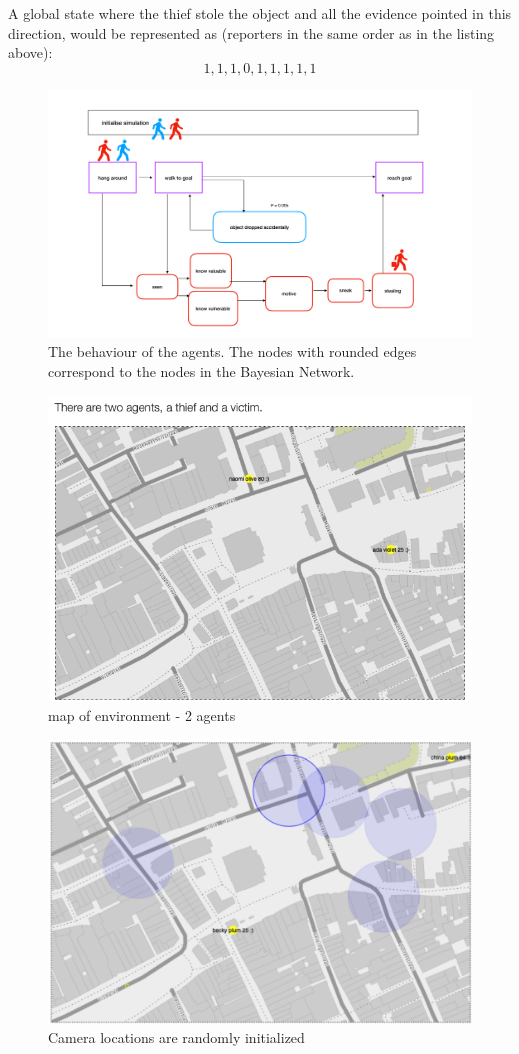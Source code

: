 \documentclass[12pt]{article}
\begin{document}
A global state where the thief stole the object and all the evidence pointed in this direction, would be represented as (reporters in the same order as in the listing above):
 \[1,1,1,0,1,1,1,1,1\]



\begin{figure}[htbp]
\centering
\includegraphics[width=\linewidth]{images/grotemarkt.pdf}
\caption{The behaviour of the agents. The nodes with rounded edges correspond to the nodes in the Bayesian Network.}
\label{behaviourGM}
\end{figure}

\begin{figure}[htbp]
\centering
\includegraphics[width=0.75\linewidth]{images/grotemarktmap.png}
\caption{map of environment - 2 agents}
\label{groteMarkt1}
\end{figure}

\begin{figure}[htbp]
\centering
\includegraphics[width=0.75\linewidth]{images/agentGM.png}
\caption{Camera locations are randomly initialized}
\label{groteMarkt}
\end{figure}
\end{document}
